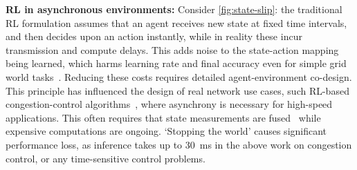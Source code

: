 \documentclass[
sigconf,natbib=false
]{acmart}
\newcommand{\fakepara}[1]{\noindent\textbf{#1:}}
\newcounter{insightc}
\newenvironment{insight}
	{
		\begin{tipblock}\refstepcounter{insightc}\textbf{Insight \theinsightc:}\em
	}
	{
		\end{tipblock}
	}
\begin{document}

\fakepara{RL in asynchronous environments}
Consider \cref{fig:state-slip}: the traditional RL formulation assumes that an agent receives new state at fixed time intervals, and then decides upon an action instantly, while in reality these incur transmission and compute delays.
This adds noise to the state-action mapping being learned, which harms learning rate and final accuracy even for simple grid world tasks~\parencite{DBLP:journals/firai/TravnikMSP18}.
Reducing these costs requires detailed agent-environment co-design.
This principle has influenced the design of real network use cases, such RL-based congestion-control algorithms~\parencite{DBLP:journals/corr/abs-1910-04054}, where asynchrony is necessary for high-speed applications.
This often requires that state measurements are fused~\parencite{DBLP:journals/corr/abs-1910-04054,DBLP:journals/tnsm/SimpsonRP20} while expensive computations are ongoing.
`Stopping the world' causes significant performance loss, as inference takes up to \SI{30}{\milli\second} in the above work on congestion control, or any time-sensitive control problems.
\end{document}
